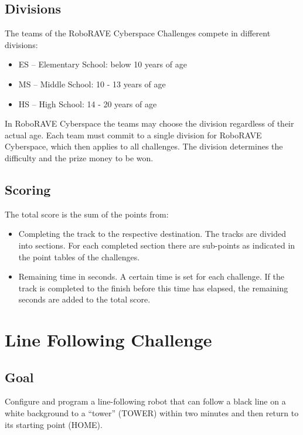 \documentclass[a4paper,12pt]{article}
\begin{document}
\subsection{Divisions}

The teams of the RoboRAVE Cyberspace Challenges compete in different divisions:

\begin{itemize}
	\item ES – Elementary School: below 10 years of age
	\item MS – Middle School: 10 - 13 years of age
	\item HS – High School: 14 - 20 years of age
\end{itemize}

In RoboRAVE Cyberspace the teams may choose the division regardless of their
actual age. Each team must commit to a single division for RoboRAVE Cyberspace,
which then applies to all challenges. The division determines the difficulty
and the prize money to be won.

\subsection{Scoring}

The total score is the sum of the points from:
\begin{itemize}
	\item Completing the track to the respective destination. The tracks
		are divided into sections. For each completed section there are
		sub-points as indicated in the point tables of the challenges.
	\item Remaining time in seconds. A certain time is set for each
		challenge. If the track is completed to the finish before this
		time has elapsed, the remaining seconds are added to the total
		score.
\end{itemize}

\section{Line Following Challenge}

\subsection{Goal}

Configure and program a line-following robot that can follow a black line on a
white background to a "`tower"' (TOWER) within two minutes and then return to
its starting point (HOME).
\end{document}
